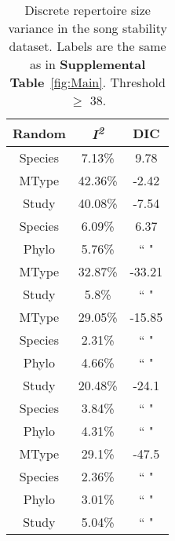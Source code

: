 \documentclass{article}
\begin{document}
  \begin{table}[H]
  \centering
  \caption{Discrete repertoire size variance in the song stability dataset. Labels are the same as in \textbf{Supplemental Table}~\ref{fig:Main}. Threshold $\ge$ 38.} 
  \begin{tabular}{ccc}
  \hline
  Random & \textit{I\textsuperscript{2}} & DIC \\ 
  \hline
  Species & 7.13\% & 9.78 \\ \hdashline
  MType & 42.36\% & -2.42 \\ \hdashline
  Study & 40.08\% & -7.54 \\ \hdashline
  Species & 6.09\% & 6.37 \\ 
  Phylo & 5.76\% & `` " \\ \hdashline
  MType & 32.87\% & -33.21 \\ 
  Study & 5.8\% & `` " \\ \hdashline
  MType & 29.05\% & -15.85 \\ 
  Species & 2.31\% & `` " \\ 
  Phylo & 4.66\% & `` " \\ \hdashline
  Study & 20.48\% & -24.1 \\ 
  Species & 3.84\% & `` " \\ 
  Phylo & 4.31\% & `` " \\ \hdashline
  MType & 29.1\% & -47.5 \\ 
  Species & 2.36\% & `` " \\ 
  Phylo & 3.01\% & `` " \\ 
  Study & 5.04\% & `` " \\ 
  \hline
  \end{tabular}
  \end{table}
\end{document}
